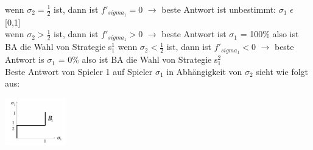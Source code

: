 \documentclass[11pt]{article}
\begin{document}
wenn \(\sigma_2 = \frac{1}{2}\) ist, dann ist \(f'_{sigma_1}=0\) \(\rightarrow\) beste Antwort ist unbestimmt: \(\sigma_{\text{1}}\) \(\epsilon\) [0,1]\\
wenn \(\sigma_2 > \frac{1}{2}\) ist, dann ist \(f'_{sigma_1}>0\) \(\rightarrow\) beste Antwort ist \(\sigma_{\text{1}}\) = 100\% also ist BA die Wahl von Strategie s\(^{\text{1}}_{\text{1}}\)
wenn \(\sigma_2 < \frac{1}{2}\) ist, dann ist \(f'_{sigma_1}<0\) \(\rightarrow\) beste Antwort is \(\sigma_{\text{1}}\) = 0\% also ist BA die Wahl von Strategie s\(^{\text{2}}_{\text{1}}\)\\
\newpage
Beste Antwort von Spieler 1 auf Spieler \(\sigma_{\text{1}}\) in Abhängigkeit von \(\sigma_{\text{2}}\) sieht wie folgt aus:
\begin{center}
\includegraphics[width=100px]{./Kop_Zahl_BA.png}
\end{center}
\end{document}
